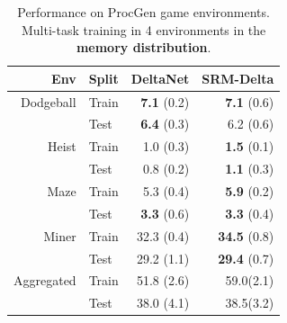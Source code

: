 \documentclass[nohyperref]{article}
\theoremstyle{plain}
\theoremstyle{definition}
\theoremstyle{remark}
\begin{document}
\begin{table}[h]
\caption{Performance on ProcGen game environments. Multi-task training in 4 environments in the \textbf{memory distribution}.
}
\label{app:tab:multi4_po}
\begin{center}
\begin{tabular}{rlrr}
\toprule
Env & Split & DeltaNet & SRM-Delta \\ \midrule
Dodgeball & Train  &  \textbf{7.1} (0.2) &  \textbf{7.1} (0.6) \\
       & Test  &  \textbf{6.4} (0.3) & 6.2 (0.6) \\ \midrule
Heist & Train  & 1.0 (0.3) &  \textbf{1.5} (0.1)  \\
      & Test   & 0.8 (0.2) &  \textbf{1.1} (0.3)\\ \midrule
Maze & Train  & 5.3 (0.4)&  \textbf{5.9} (0.2) \\
     & Test   &  \textbf{3.3} (0.6) &  \textbf{3.3} (0.4) \\ \midrule
Miner  & Train & 32.3 (0.4) & \textbf{34.5} (0.8) \\
       & Test  & 29.2 (1.1) &  \textbf{29.4} (0.7) \\ \midrule \midrule
Aggregated  & Train & 51.8 (2.6) & 59.0(2.1) \\
                  & Test  & 38.0 (4.1) & 38.5(3.2) \\
\bottomrule
\end{tabular}
\end{center}
\end{table}
\end{document}
